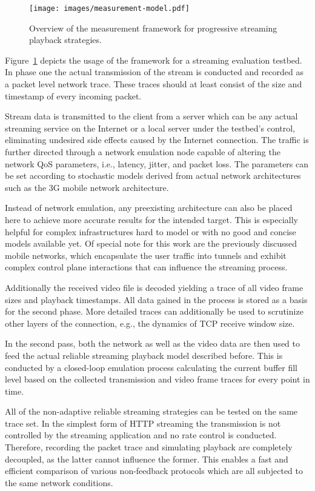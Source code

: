 \begin{figure}[htb]
	\centering
	\texttt{[image: images/measurement-model.pdf]}
	\caption{Overview of the measurement framework for progressive streaming playback strategies.}
\label{c3:fig:framework}
\end{figure}

Figure~\ref{c3:fig:framework} depicts the usage of the framework for a streaming evaluation testbed. In phase one the actual transmission of the stream is conducted and recorded as a packet level network trace. These traces should at least consist of the size and timestamp of every incoming packet.

Stream data is transmitted to the client from a server which can be any actual streaming service on the Internet or a local server under the testbed's control, eliminating undesired side effects caused by the Internet connection. The traffic is further directed through a network emulation node capable of altering the network \gls{QoS} parameters, i.e., latency, jitter, and packet loss. The parameters can be set according to stochastic models derived from actual network architectures such as the \gls{3G} mobile network architecture.

Instead of network emulation, any preexisting architecture can also be placed here to achieve more accurate results for the intended target. This is especially helpful for complex infrastructures hard to model or with no good and concise models available yet. Of special note for this work are the previously discussed mobile networks, which encapsulate the user traffic into tunnels and exhibit complex control plane interactions that can influence the streaming process.

Additionally the received video file is decoded yielding a trace of all video frame sizes and playback timestamps. All data gained in the process is stored as a basis for the second phase. More detailed traces can additionally be used to scrutinize other layers of the connection, e.g., the dynamics of \gls{TCP} receive window size. 

In the second pass, both the network as well as the video data are then used to feed the actual reliable streaming playback model described before. This is conducted by a closed-loop emulation process calculating the current buffer fill level based on the collected transmission and video frame traces for every point in time. 

All of the non-adaptive reliable streaming strategies can be tested on the same trace set. In the simplest form of \gls{HTTP} streaming the transmission is not controlled by the streaming application and no rate control is conducted. Therefore, recording the packet trace and simulating playback are completely decoupled, as the latter cannot influence the former. This enables a fast and efficient comparison of various non-feedback protocols which are all subjected to the same network conditions.

